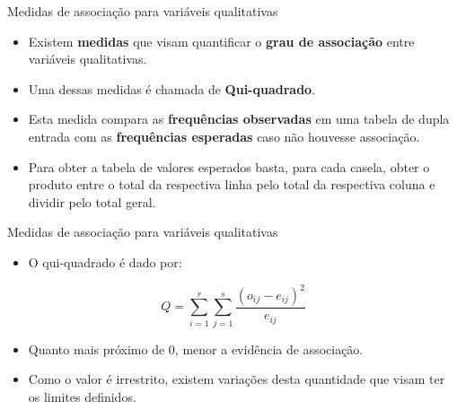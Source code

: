 \documentclass[
  ignorenonframetext,
  serif,
  professionalfont,
  usenames,
  dvipsnames,
  aspectratio = 169]{beamer}
\providecommand{\tightlist}{%
  \setlength{\itemsep}{0pt}\setlength{\parskip}{0pt}}
\renewcommand{\tightlist}{%
  \setlength{\itemsep}{0\baselineskip}
  \setlength{\parskip}{0.25\baselineskip}
}
\begin{document}
\begin{frame}{Medidas de associação para variáveis qualitativas}
\label{medidas-de-associauxe7uxe3o-para-variuxe1veis-qualitativas}
\begin{itemize}
\item
  Existem \textbf{medidas} que visam quantificar o
  \textbf{grau de associação} entre variáveis qualitativas.
\item
  Uma dessas medidas é chamada de \textbf{Qui-quadrado}.
\item
  Esta medida compara as \textbf{frequências observadas} em uma tabela
  de dupla entrada com as \textbf{frequências esperadas} caso não
  houvesse associação.
\item
  Para obter a tabela de valores esperados basta, para cada casela,
  obter o produto entre o total da respectiva linha pelo total da
  respectiva coluna e dividir pelo total geral.
\end{itemize}
\end{frame}

\begin{frame}{Medidas de associação para variáveis qualitativas}
\label{medidas-de-associauxe7uxe3o-para-variuxe1veis-qualitativas-1}
\begin{itemize}
\tightlist
\item
  O qui-quadrado é dado por:
\end{itemize}

\[Q = \sum_{i=1}^{r} \sum_{j=1}^{s} \frac{(o_{ij} - e_{ij})^2}{e_{ij}}\]

\begin{itemize}
\item
  Quanto mais próximo de 0, menor a evidência de associação.
\item
  Como o valor é irrestrito, existem variações desta quantidade que
  visam ter os limites definidos.
\end{itemize}
\end{frame}
\end{document}
